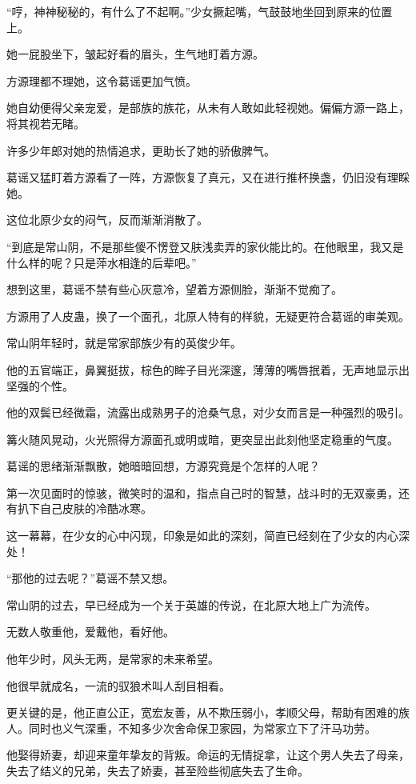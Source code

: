 \begin{this_body}
“哼，神神秘秘的，有什么了不起啊。”少女撅起嘴，气鼓鼓地坐回到原来的位置上。

她一屁股坐下，皱起好看的眉头，生气地盯着方源。

方源理都不理她，这令葛谣更加气愤。

她自幼便得父亲宠爱，是部族的族花，从未有人敢如此轻视她。偏偏方源一路上，将其视若无睹。

许多少年郎对她的热情追求，更助长了她的骄傲脾气。

葛谣又猛盯着方源看了一阵，方源恢复了真元，又在进行推杯换盏，仍旧没有理睬她。

这位北原少女的闷气，反而渐渐消散了。

“到底是常山阴，不是那些傻不愣登又肤浅卖弄的家伙能比的。在他眼里，我又是什么样的呢？只是萍水相逢的后辈吧。”

想到这里，葛谣不禁有些心灰意冷，望着方源侧脸，渐渐不觉痴了。

方源用了人皮蛊，换了一个面孔，北原人特有的样貌，无疑更符合葛谣的审美观。

常山阴年轻时，就是常家部族少有的英俊少年。

他的五官端正，鼻翼挺拔，棕色的眸子目光深邃，薄薄的嘴唇抿着，无声地显示出坚强的个性。

他的双鬓已经微霜，流露出成熟男子的沧桑气息，对少女而言是一种强烈的吸引。

篝火随风晃动，火光照得方源面孔或明或暗，更突显出此刻他坚定稳重的气度。

葛谣的思绪渐渐飘散，她暗暗回想，方源究竟是个怎样的人呢？

第一次见面时的惊骇，微笑时的温和，指点自己时的智慧，战斗时的无双豪勇，还有扒下自己皮肤的冷酷冰寒。

这一幕幕，在少女的心中闪现，印象是如此的深刻，简直已经刻在了少女的内心深处！

“那他的过去呢？”葛谣不禁又想。

常山阴的过去，早已经成为一个关于英雄的传说，在北原大地上广为流传。

无数人敬重他，爱戴他，看好他。

他年少时，风头无两，是常家的未来希望。

他很早就成名，一流的驭狼术叫人刮目相看。

更关键的是，他正直公正，宽宏友善，从不欺压弱小，孝顺父母，帮助有困难的族人。同时也义气深重，不知多少次舍命保卫家园，为常家立下了汗马功劳。

他娶得娇妻，却迎来童年挚友的背叛。命运的无情捉拿，让这个男人失去了母亲，失去了结义的兄弟，失去了娇妻，甚至险些彻底失去了生命。


\end{this_body}
